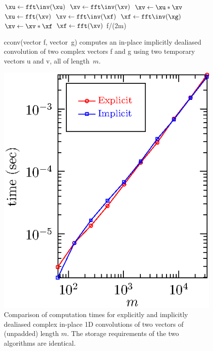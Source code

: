 \documentclass[final]{siamltex}
\begin{document}
\begin{figure}[htbp]
\begin{minipage}{0.5\linewidth}
\begin{function}[H]
  \medskip
  $\xu \leftarrow \fft\inv(\xu)$\;
  $\xv \leftarrow \fft\inv(\xv)$\;
  $\xv \leftarrow \xu * \xv$\;
  $\xu \leftarrow \fft(\xv)$\;
  \medskip
  $\xv \leftarrow \fft\inv(\xf)$\;
  $\xf \leftarrow \fft\inv(\xg)$\;
  $\xv \leftarrow \xv * \xf$\;
  $\xf \leftarrow \fft(\xv)$\;
  \Return f/(2m)\;
\caption{cconv(vector {\sf f}, vector~{\sf g}) computes
an in-place implicitly dealiased convolution of two complex vectors {\sf f}
and {\sf g} using two temporary vectors {\sf u} and {\sf v}, all of
length~$m$.}\label{cconv}
\end{function}
\end{minipage}
\begin{minipage}{0.5\linewidth}
\begin{center}
\includegraphics{timing1c}
\caption{Comparison of computation times for explicitly and implicitly
dealiased complex in-place 1D convolutions of two vectors of
(unpadded) length $m$. The storage requirements of the two algorithms are
identical.}
\label{timing1c}
\end{center}
\end{minipage}
\end{figure}
\end{document}
